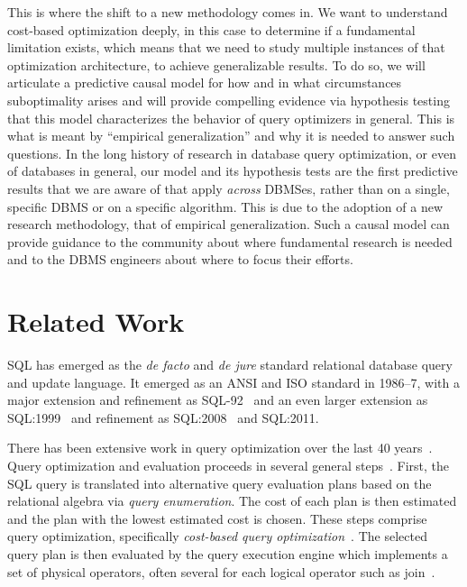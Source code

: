 \documentclass[prodmode,acmtods]{acmsmall}
\begin{document}
This is where the shift to a new methodology comes in. We want to understand
cost-based optimization deeply, in this case to determine if a fundamental
limitation exists, which means that we need to study multiple instances of
that optimization architecture, to achieve generalizable results. To do so,
we will articulate a predictive causal model for how
and in what circumstances suboptimality arises and will provide compelling
evidence via \hbox{hypothesis} testing that this model characterizes the
\hbox{behavior} of query optimizers in general. This is what is meant by ``empirical
generalization'' and why it is needed to answer such questions. In
  the long history of research in database query optimization, or even of
  databases in general, our model and its hypothesis tests are the first
  predictive results that we are aware of that apply {\em across}
  \hbox{DBMSes}, rather than on a single, specific \hbox{DBMS} or on a
  specific algorithm. This is due to the adoption of a new research
  methodology, that of empirical generalization. Such a causal model can
\hbox{provide} guidance to the community about where fundamental research is needed
and to the \hbox{DBMS} engineers about where to focus their efforts.

\section{Related Work}\label{sec:related}

SQL has emerged as the {\em de facto} and {\em de jure} standard relational
database query and update language. It emerged as an ANSI and ISO standard
in 1986--7, with a major extension and refinement as SQL-92~\cite{Melton93} 
and an even larger extension as SQL:1999~\cite{Melton03} and refinement as
SQL:2008~\cite{SQL2008} and SQL:2011. 

There has been extensive work in query optimization over the last 40
years~\cite{Ioannidis96,Jarke84}. Query optimization and evaluation
proceeds in several general steps~\cite{Ramakrishnan03}. First, the SQL query is 
translated into alternative query evaluation plans based on the 
relational algebra via {\em query enumeration}. The cost
of each plan is then estimated and the plan with the lowest estimated cost
is chosen. These steps comprise query optimization, specifically {\em
cost-based query optimization}~\cite{Selinger}. The selected query plan is
then evaluated by the query execution engine which implements a set of
physical operators, often several for each logical operator such as
join~\cite{Graefe93}.
\end{document}
